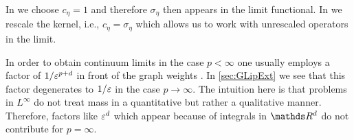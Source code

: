 \begin{remark}{}{}
In \cite{roith2022continuum} we choose $c_\eta=1$ and therefore $\sigma_\eta$ then appears in the limit functional. In \cite{bungert2021uniform} we rescale the kernel, i.e., $c_\eta = \sigma_\eta$ which allows us to work with unrescaled operators in the limit. 
\end{remark}
%
%
%
\begin{remark}{}{}
In order to obtain continuum limits in the case $p<\infty$ one usually employs a factor of $1/\varepsilon^{p+d}$ in front of the graph weights \cite{GarcSlep15, slepcev2019analysis}. In \cref{sec:GLipExt} we see that this factor degenerates to $1/\varepsilon$ in the case $p\to\infty$. The intuition here is that problems in $L^\infty$ do not treat mass in a quantitative but rather a qualitative manner. Therefore, factors like $\varepsilon^d$ which appear because of integrals in $\R^d$ do not contribute for $p=\infty$.
\end{remark}
%
%
